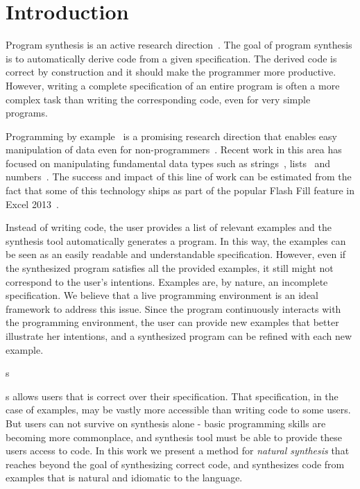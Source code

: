 \section{Introduction} 
\label{intro}

Program synthesis is an active research direction~\cite{DBLP:journals/toplas/MannaW80, DBLP:journals/cacm/GulwaniHS12, 
DBLP:conf/icfp/Bodik15, DBLP:conf/pldi/KuncakMPS10, DBLP:conf/aplas/Solar-Lezama09, DBLP:conf/pldi/SrivastavaGCF11}. The goal of program synthesis is 
to automatically derive code from a given specification. The derived code is correct by construction and it should make the programmer more productive.
However, writing a complete specification of an entire program is often a more complex task than writing the corresponding code, even for very simple programs.

Programming by example~\cite{cypher93,lieberman01,synasc12} is a promising research direction that enables easy manipulation of data even for non-programmers~\cite{GulwaniHS12}. Recent work in this area has focused on manipulating fundamental data types such as strings~\cite{flashFillPOPL,vldb12,icml13}, lists~\cite{FeserCD15,poseraZ15} and numbers~\cite{cav12}. The success and impact of this line of work can be estimated from the fact that some of this technology ships as part of the popular Flash Fill feature in Excel 2013~\cite{flashFillPOPL}.
 
Instead of writing code, the user provides a list of relevant examples and the synthesis tool automatically generates a program. In this way, the examples can be seen as an easily readable and understandable specification. However, even if the synthesized program satisfies all the provided examples, it still might not correspond to the user's intentions. Examples are, by nature, an incomplete specification. We believe that a live programming environment is an ideal framework to address this issue. Since the program continuously interacts with the programming environment, the user can provide new examples that better illustrate her intentions, and a synthesized program can be refined with each new example.


s

s
allows users that is correct over their
specification.  That specification, in the case of examples, may be
vastly more accessible than writing code to some users.  But users can
not survive on synthesis alone - basic programming skills are becoming
more commonplace, and synthesis tool must be able to provide these
users access to code.  In this work we present a method for
\textit{natural synthesis} that reaches beyond the goal of
synthesizing correct code, and synthesizes code from examples that is
natural and idiomatic to the language.

